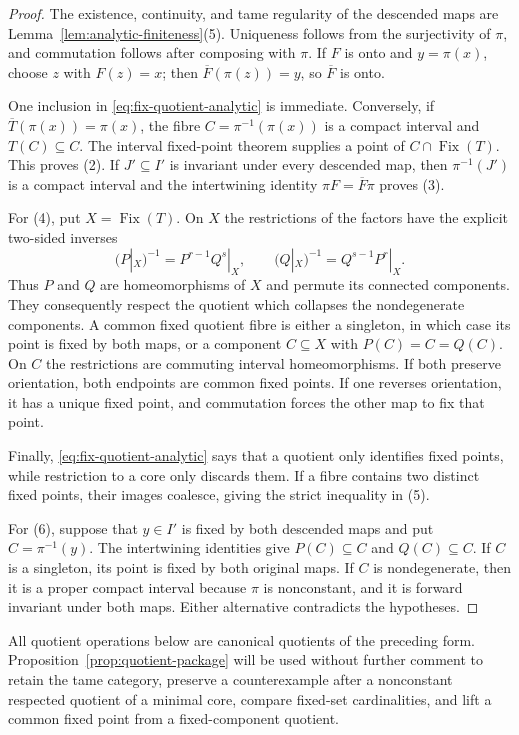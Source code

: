 \documentclass[11pt]{article}
\theoremstyle{definition}
\theoremstyle{remark}
\newcommand{\Fix}{\operatorname{Fix}}
\begin{document}
\begin{proof}
The existence, continuity, and tame regularity of the descended maps are
Lemma~\ref{lem:analytic-finiteness}(5).  Uniqueness follows from the
surjectivity of $\pi$, and commutation follows after composing with $\pi$.
If $F$ is onto and $y=\pi(x)$, choose $z$ with $F(z)=x$; then
$\overline F(\pi(z))=y$, so $\overline F$ is onto.

One inclusion in \eqref{eq:fix-quotient-analytic} is immediate.  Conversely,
if $\overline T(\pi(x))=\pi(x)$, the fibre
$C=\pi^{-1}(\pi(x))$ is a compact interval and $T(C)\subseteq C$.
The interval fixed-point theorem supplies a point of $C\cap\Fix(T)$.
This proves (2).  If $J'\subseteq I'$ is invariant under every descended
map, then $\pi^{-1}(J')$ is a compact interval and the intertwining identity
$\pi F=\overline F\pi$ proves (3).

For (4), put $X=\Fix(T)$.  On $X$ the restrictions of the factors have the
explicit two-sided inverses
\[
 (P|_X)^{-1}=P^{r-1}Q^s|_X,\qquad
 (Q|_X)^{-1}=Q^{s-1}P^r|_X.
\]
Thus $P$ and $Q$ are homeomorphisms of $X$ and permute its connected
components.  They consequently respect the quotient which collapses the
nondegenerate components.  A common fixed quotient fibre is either a
singleton, in which case its point is fixed by both maps, or a component
$C\subseteq X$ with $P(C)=C=Q(C)$.  On $C$ the restrictions are commuting
interval homeomorphisms.  If both preserve orientation, both endpoints are
common fixed points.  If one reverses orientation, it has a unique fixed
point, and commutation forces the other map to fix that point.

Finally, \eqref{eq:fix-quotient-analytic} says that a quotient only identifies
fixed points, while restriction to a core only discards them.  If a fibre
contains two distinct fixed points, their images coalesce, giving the strict
inequality in (5).

For (6), suppose that $y\in I'$ is fixed by both descended maps and put
$C=\pi^{-1}(y)$.  The intertwining identities give
$P(C)\subseteq C$ and $Q(C)\subseteq C$.  If $C$ is a singleton, its point is
fixed by both original maps.  If $C$ is nondegenerate, then it is a proper
compact interval because $\pi$ is nonconstant, and it is forward invariant
under both maps.  Either alternative contradicts the hypotheses.
\end{proof}

All quotient operations below are canonical quotients of the preceding
form.  Proposition~\ref{prop:quotient-package} will be used without further
comment to retain the tame category, preserve a counterexample after a
nonconstant respected quotient of a minimal core, compare fixed-set
cardinalities, and lift a common fixed point from a fixed-component quotient.
\end{document}
